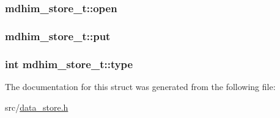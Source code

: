\hypertarget{structmdhim__store__t_a8d77b86eb31d677f36b46f653865ea1d}{
\subsubsection[{open}]{ mdhim\-\_\-store\-\_\-t\-::open}}\label{d1/dab/structmdhim__store__t_a8d77b86eb31d677f36b46f653865ea1d}
\hypertarget{structmdhim__store__t_a5a33c9ea5897fdf71a54573ea49fef18}{
\subsubsection[{put}]{ mdhim\-\_\-store\-\_\-t\-::put}}\label{d1/dab/structmdhim__store__t_a5a33c9ea5897fdf71a54573ea49fef18}
\hypertarget{structmdhim__store__t_a00f8694bd01cc8cfda7479b7384e083b}{
\subsubsection[{type}]{\setlength{\rightskip}{0pt plus 5cm}int mdhim\-\_\-store\-\_\-t\-::type}}\label{d1/dab/structmdhim__store__t_a00f8694bd01cc8cfda7479b7384e083b}


The documentation for this struct was generated from the following file\-:\begin{DoxyCompactItemize}
\item 
src/\hyperlink{data__store_8h}{data\-\_\-store.\-h}\end{DoxyCompactItemize}
